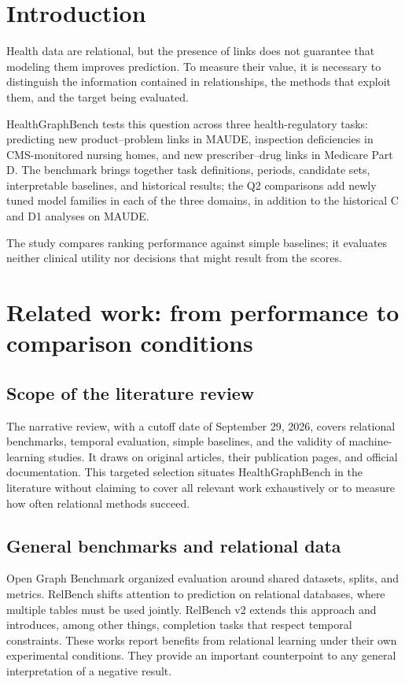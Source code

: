 \section{Introduction}

Health data are relational, but the presence of links does not guarantee that modeling them improves prediction. To measure their value, it is necessary to distinguish the information contained in relationships, the methods that exploit them, and the target being evaluated.

HealthGraphBench tests this question across three health-regulatory tasks: predicting new product--problem links in MAUDE, inspection deficiencies in CMS-monitored nursing homes, and new prescriber--drug links in Medicare Part D. The benchmark brings together task definitions, periods, candidate sets, interpretable baselines, and historical results; the Q2 comparisons add newly tuned model families in each of the three domains, in addition to the historical C and D1 analyses on MAUDE.

The study compares ranking performance against simple baselines; it evaluates neither clinical utility nor decisions that might result from the scores.

\section{Related work: from performance to comparison conditions}

\subsection{Scope of the literature review}

The narrative review, with a cutoff date of September 29, 2026, covers relational benchmarks, temporal evaluation, simple baselines, and the validity of machine-learning studies. It draws on original articles, their publication pages, and official documentation. This targeted selection situates HealthGraphBench in the literature without claiming to cover all relevant work exhaustively or to measure how often relational methods succeed.

\subsection{General benchmarks and relational data}

Open Graph Benchmark organized evaluation around shared datasets, splits, and metrics\cite{hu2020ogb}. RelBench shifts attention to prediction on relational databases, where multiple tables must be used jointly\cite{robinson2024relbench}. RelBench v2 extends this approach and introduces, among other things, completion tasks that respect temporal constraints\cite{gu2026relbench}. These works report benefits from relational learning under their own experimental conditions. They provide an important counterpoint to any general interpretation of a negative result.

